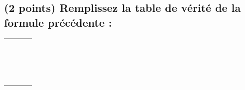 \documentclass[11pt,a4paper]{article}
\begin{document}
\begin{table}[!ht]
  \centering
  \begin{minipage}{0.50\textwidth}
    \centering

\subsection{(2 points) Remplissez la table de vérité de la formule précédente : }


\begin{center}
\begin{tabular}{|C{0.75cm}|C{0.75cm}|C{0.75cm} | C{0.75cm}|}
\hline
{} &  &   &   \\
 &  &   &   \\
\hline
 & &   &  \\
 & &   &  \\ \hline
 & &   &  \\
 & &   &  \\ \hline
 & &   &  \\
 & &   &  \\ \hline
 & &   &  \\
 & &   &  \\ \hline
 & &   &  \\
 & &   &  \\ \hline
 & &   &  \\
 & &   &  \\ \hline
 & &   &  \\
 & &   &  \\ \hline
 & &   &  \\
 & &   &  \\ \hline
\end{tabular}
\end{center}


  \end{minipage}
  \hfillx
  \begin{minipage}{0.50\textwidth}


\end{minipage}
\end{table}
\end{document}
